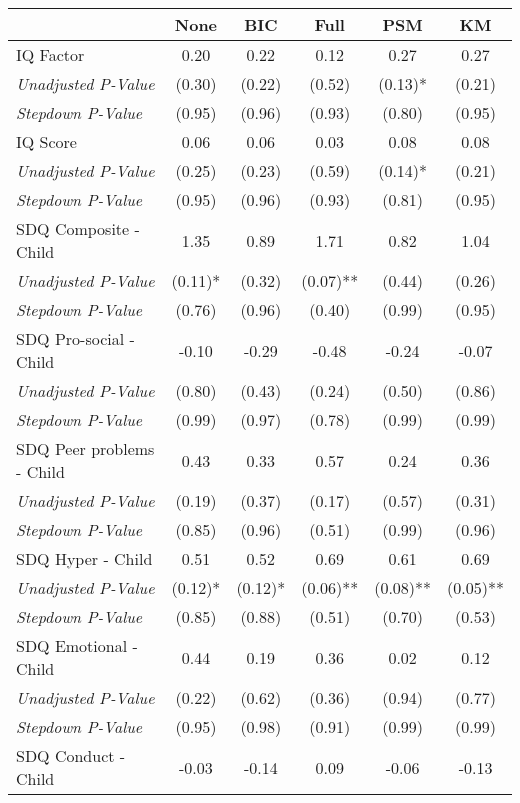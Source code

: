 \begin{tabular}{l c c c c c}
\toprule
 & None & BIC & Full & PSM & KM \\
\midrule
IQ Factor & 0.20 & 0.22 & 0.12 & 0.27 & 0.27 \\
\quad \textit{Unadjusted P-Value} & (0.30) & (0.22) & (0.52) & (0.13)* & (0.21) \\
\quad \textit{Stepdown P-Value} & (0.95) & (0.96) & (0.93) & (0.80) & (0.95) \\
IQ Score & 0.06 & 0.06 & 0.03 & 0.08 & 0.08 \\
\quad \textit{Unadjusted P-Value} & (0.25) & (0.23) & (0.59) & (0.14)* & (0.21) \\
\quad \textit{Stepdown P-Value} & (0.95) & (0.96) & (0.93) & (0.81) & (0.95) \\
SDQ Composite - Child & 1.35 & 0.89 & 1.71 & 0.82 & 1.04 \\
\quad \textit{Unadjusted P-Value} & (0.11)* & (0.32) & (0.07)** & (0.44) & (0.26) \\
\quad \textit{Stepdown P-Value} & (0.76) & (0.96) & (0.40) & (0.99) & (0.95) \\
SDQ Pro-social - Child & -0.10 & -0.29 & -0.48 & -0.24 & -0.07 \\
\quad \textit{Unadjusted P-Value} & (0.80) & (0.43) & (0.24) & (0.50) & (0.86) \\
\quad \textit{Stepdown P-Value} & (0.99) & (0.97) & (0.78) & (0.99) & (0.99) \\
SDQ Peer problems - Child & 0.43 & 0.33 & 0.57 & 0.24 & 0.36 \\
\quad \textit{Unadjusted P-Value} & (0.19) & (0.37) & (0.17) & (0.57) & (0.31) \\
\quad \textit{Stepdown P-Value} & (0.85) & (0.96) & (0.51) & (0.99) & (0.96) \\
SDQ Hyper - Child & 0.51 & 0.52 & 0.69 & 0.61 & 0.69 \\
\quad \textit{Unadjusted P-Value} & (0.12)* & (0.12)* & (0.06)** & (0.08)** & (0.05)** \\
\quad \textit{Stepdown P-Value} & (0.85) & (0.88) & (0.51) & (0.70) & (0.53) \\
SDQ Emotional - Child & 0.44 & 0.19 & 0.36 & 0.02 & 0.12 \\
\quad \textit{Unadjusted P-Value} & (0.22) & (0.62) & (0.36) & (0.94) & (0.77) \\
\quad \textit{Stepdown P-Value} & (0.95) & (0.98) & (0.91) & (0.99) & (0.99) \\
SDQ Conduct - Child & -0.03 & -0.14 & 0.09 & -0.06 & -0.13 \\

\end{tabular}
